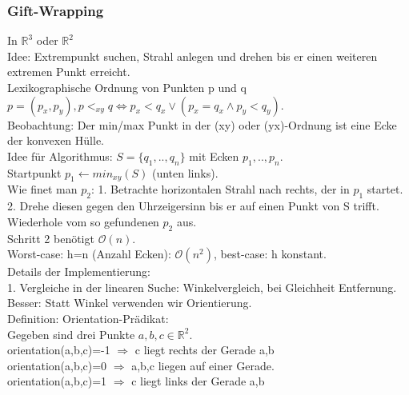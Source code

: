 \documentclass[a4paper]{article}
\newcommand{\oh}[1]{$\mathcal{O}(#1)$}
\begin{document}
\subsubsection{Gift-Wrapping}
In $\mathbb{R}^3$ oder $\mathbb{R}^2$\\
Idee: Extrempunkt suchen, Strahl anlegen und drehen bis er einen weiteren extremen Punkt erreicht.\\
Lexikographische Ordnung von Punkten p und q $p=(p_x,p_y), p<_{xy} q \Leftrightarrow p_x < q_x \vee (p_x=q_x \wedge p_y<q_y)$.\\
Beobachtung: Der min/max  Punkt in der (xy) oder (yx)-Ordnung ist eine Ecke der konvexen Hülle.\\
Idee für Algorithmus: $S=\{q_1,..,q_n\}$ mit Ecken $p_1,..,p_n$.\\
Startpunkt $p_1\leftarrow min_{xy}(S)$ (unten links).\\
Wie finet man $p_2$: 1. Betrachte horizontalen Strahl nach rechts, der in $p_1$ startet. 2. Drehe diesen gegen den Uhrzeigersinn bis er auf einen Punkt von S trifft. Wiederhole vom so gefundenen $p_2$ aus.\\
Schritt 2 benötigt \oh{n}.\\
Worst-case: h=n (Anzahl Ecken): \oh{n^2}, best-case: h konstant.\\
Details der Implementierung:\\
1. Vergleiche in der linearen Suche: Winkelvergleich, bei Gleichheit Entfernung. Besser: Statt Winkel verwenden wir Orientierung.\\
Definition: Orientation-Prädikat:\\
Gegeben sind drei Punkte $a,b,c \in \mathbb{R}^2$. \\
orientation(a,b,c)=-1 $\Rightarrow$ c liegt rechts der Gerade a,b\\
orientation(a,b,c)=0 $\Rightarrow$ a,b,c liegen auf einer Gerade.\\
orientation(a,b,c)=1 $\Rightarrow$ c liegt links der Gerade a,b\\
\end{document}
